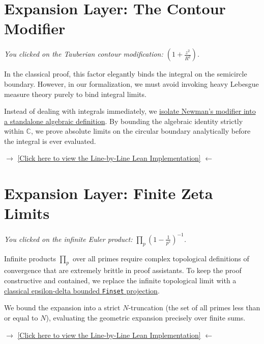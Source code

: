 \documentclass[12pt]{article}
\begin{document}
\section*{Expansion Layer: The Contour Modifier}
\label{layer2:modifier}

\textit{You clicked on the Tauberian contour modification: $\left( 1 + \frac{z^2}{R^2} \right)$.}

In the classical proof, this factor elegantly binds the integral on the semicircle boundary. However, in our formalization, we must avoid invoking heavy Lebesgue measure theory purely to bind integral limits. 

Instead of dealing with integrals immediately, we \hyperref[layer3:modifier]{isolate Newman's modifier into a standalone algebraic definition}. By bounding the algebraic identity strictly within $\mathbb{C}$, we prove absolute limits on the circular boundary analytically before the integral is ever evaluated.

\begin{center}
    $\to$ \hyperref[layer3:modifier]{[Click here to view the Line-by-Line Lean Implementation]} $\leftarrow$
\end{center}

\newpage
\section*{Expansion Layer: Finite Zeta Limits}
\label{layer2:zeta}

\textit{You clicked on the infinite Euler product: $\prod_p \left(1 - \frac{1}{p^s}\right)^{-1}$.}

Infinite products $\prod_{p}$ over all primes require complex topological definitions of convergence that are extremely brittle in proof assistants. To keep the proof constructive and contained, we replace the infinite topological limit with a \hyperref[layer3:zeta]{classical epsilon-delta bounded \texttt{Finset} projection}.

We bound the expansion into a strict $N$-truncation (the set of all primes less than or equal to $N$), evaluating the geometric expansion precisely over finite sums.

\begin{center}
    $\to$ \hyperref[layer3:zeta]{[Click here to view the Line-by-Line Lean Implementation]} $\leftarrow$
\end{center}
\end{document}
